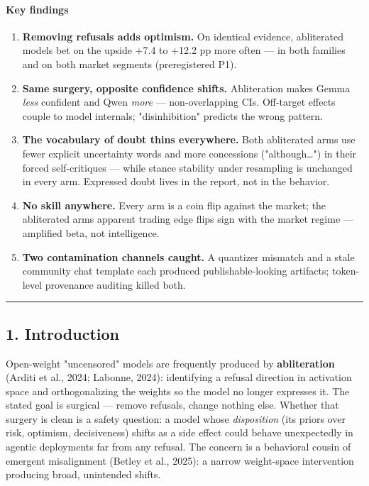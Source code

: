 \documentclass[
  10pt,
]{article}
\providecommand{\tightlist}{%
  \setlength{\itemsep}{0pt}\setlength{\parskip}{0pt}}
\begin{document}
\begin{abstract}
\end{abstract}

\paragraph{Key findings}

\begin{enumerate}
\def\labelenumi{\arabic{enumi}.}
\tightlist
\item
  \textbf{Removing refusals adds optimism.} On identical evidence,
  abliterated models bet on the upside +7.4 to +12.2 pp more often ---
  in both families and on both market segments (preregistered P1).
\item
  \textbf{Same surgery, opposite confidence shifts.} Abliteration makes
  Gemma \emph{less} confident and Qwen \emph{more} --- non-overlapping
  CIs. Off-target effects couple to model internals; "disinhibition"
  predicts the wrong pattern.
\item
  \textbf{The vocabulary of doubt thins everywhere.} Both abliterated
  arms use fewer explicit uncertainty words and more concessions
  ("although\ldots") in their forced self-critiques --- while stance
  stability under resampling is unchanged in every arm. Expressed doubt
  lives in the report, not in the behavior.
\item
  \textbf{No skill anywhere.} Every arm is a coin flip against the
  market; the abliterated arms\textquotesingle{} apparent trading edge
  flips sign with the market regime --- amplified beta, not
  intelligence.
\item
  \textbf{Two contamination channels caught.} A quantizer mismatch and a
  stale community chat template each produced publishable-looking
  artifacts; token-level provenance auditing killed both.
\end{enumerate}

\begin{center}\rule{0.5\linewidth}{0.5pt}\end{center}

\subsection{1. Introduction}\label{1-introduction}

Open-weight "uncensored" models are frequently produced by
\textbf{abliteration} (Arditi et al., 2024; Labonne, 2024): identifying
a refusal direction in activation space and orthogonalizing the weights
so the model no longer expresses it. The stated goal is surgical ---
remove refusals, change nothing else. Whether that surgery is clean is a
safety question: a model whose \emph{disposition} (its priors over risk,
optimism, decisiveness) shifts as a side effect could behave
unexpectedly in agentic deployments far from any refusal. The concern is
a behavioral cousin of emergent misalignment (Betley et al., 2025): a
narrow weight-space intervention producing broad, unintended shifts.
\end{document}

